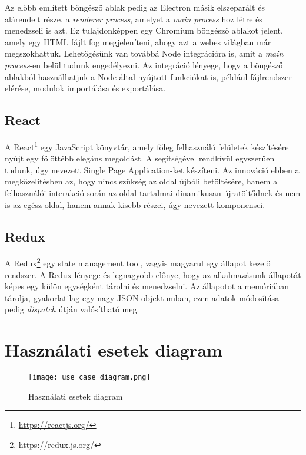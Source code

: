 Az előbb említett böngésző ablak pedig az Electron másik elszeparált és alárendelt része, a {\it renderer process}, amelyet a {\it main process} hoz létre és menedzseli is azt. Ez tulajdonképpen egy Chromium böngésző ablakot jelent, amely egy HTML fájlt fog megjeleníteni, ahogy azt a webes világban már megszokhattuk. Lehetőgésünk van továbbá Node integrációra is, amit a {\it main process}-en belül tudunk engedélyezni. Az integráció lényege, hogy a böngésző ablakból használhatjuk a Node által nyújtott funkciókat is, például fájlrendszer elérése, modulok importálása és exportálása.

\subsection{React}
A React\footnote{\url{https://reactjs.org/}} egy JavaScript könyvtár, amely főleg felhasználó felületek készítésére nyújt egy fölöttébb elegáns megoldást. A segítségével rendkívül egyszerűen tudunk, úgy nevezett Single Page Application-ket készíteni. Az innováció ebben a megközelítésben az, hogy nincs szükség az oldal újbóli betöltésére, hanem a felhasználói interakció során az oldal tartalmai dinamikusan újratöltődnek és nem is az egész oldal, hanem annak kisebb részei, úgy nevezett komponensei.

\subsection{Redux}
A Redux\footnote{\url{https://redux.js.org/}} egy state management tool, vagyis magyarul egy állapot kezelő rendszer. A Redux lényege és legnagyobb előnye, hogy az alkalmazásunk állapotát képes egy külön egységként tárolni és menedzselni. Az állapotot a memóriában tárolja, gyakorlatilag egy nagy JSON objektumban, ezen adatok módosítása pedig {\it dispatch} útján valósítható meg.

\cleardoublepage
\section{Használati esetek diagram}
\begin{figure}[H]
	\centering
	\texttt{[image: use\_case\_diagram.png]}
	\caption{Használati esetek diagram}
	\label{fig:use_case_diagram}
\end{figure}

